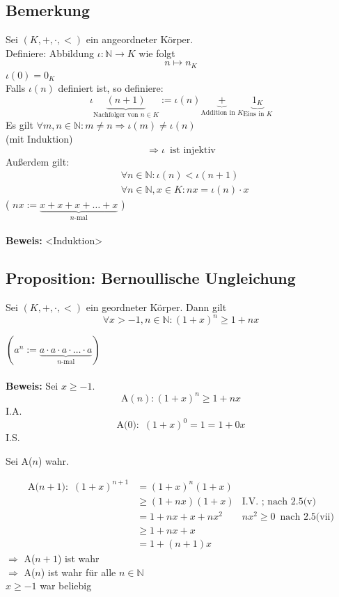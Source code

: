 \subsection{Bemerkung}
Sei \((K,+, \cdot, <)\) ein angeordneter Körper. \\
Definiere: Abbildung \( \iota : \mathds{N} \rightarrow K\) wie folgt \[ n \mapsto n_K\]
\( \iota (0) = 0_K\) \\
Falls \( \iota(n)\) definiert ist, so definiere:
\[
\iota \underbrace{(n+1)}_\text{Nachfolger von \(n \in K\)}  := \iota (n) \underbrace{+}_\text{Addition in \(K\)} \underbrace{1_K}_\text{Eins in \(K\)}
\]
Es gilt \( \forall m,n \in \mathds{N} : m \not= n \Longrightarrow \iota(m) \not= \iota(n)\) \\
(mit Induktion)
\[
\Longrightarrow \iota \enspace \text{ist injektiv}
\]
Außerdem gilt:
\begin{align*}
&\forall n \in \mathds{N} : \iota (n) < \iota (n+1) \\
&\forall n \in \mathds{N}, x \in K : n x = \iota(n) \cdot x
\end{align*}
( \(nx := \underbrace{x+x+x+ \ldots +x}_{n\text{-mal}} \) ) \\
\vspace{\baselineskip} \\
\textbf{Beweis:} <Induktion>

\subsection{Proposition: Bernoullische Ungleichung}
Sei \((K,+, \cdot, <)\) ein geordneter Körper. Dann gilt  
\[
\forall x>-1, n \in \mathds{N} : \boxed{(1+x)^n \geq 1+nx}
\]

\((a^n := \underbrace{a \cdot a \cdot a \cdot \ldots \cdot a}_{n\text{-mal}} )\) \\
\vspace{\baselineskip} \\
\textbf{Beweis:} Sei \(x \geq -1\).
\[
\text{A}(n): (1+x)^n \geq 1 +nx
\]
I.A.
\[
\text{A(\(0\)):} \enspace (1+x)^0 = 1 = 1+ 0x
\]
I.S. \\
\centerline {Sei A(\(n\)) wahr.}
\begin{align*}
\text{A(\(n+1\)):} \enspace (1+x)^{n+1} &= (1+x)^n (1+x) &{}\\
&\geq (1+nx)(1+x)  &\text{I.V. ; nach 2.5(v)}\\
&= 1+nx +x +{nx^2} &nx^2 \geq 0 \enspace \text{nach 2.5(vii)}\\
&\geq 1+ nx +x  &{}\\
&= 1+(n+1)x &{}
\end{align*}
\(\Longrightarrow\) A(\(n+1\)) ist wahr \\ 
\(\Longrightarrow\) A(\(n\)) ist wahr für alle \(n \in \mathds{N}\) \\ 
\(x \geq -1 \) war beliebig

